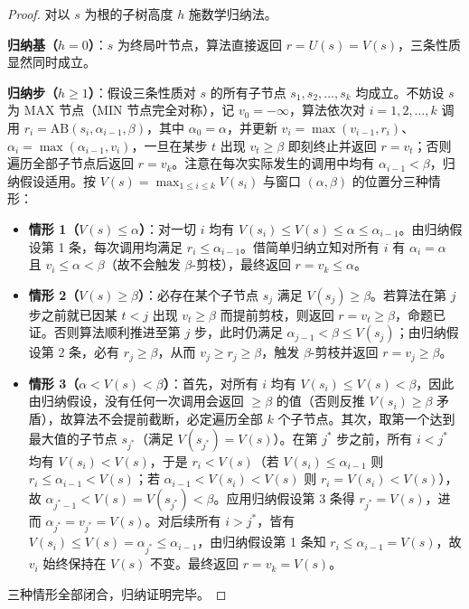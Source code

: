 \begin{proof}
对以 $s$ 为根的子树高度 $h$ 施数学归纳法。

\textbf{归纳基（$h=0$）}：$s$ 为终局叶节点，算法直接返回 $r = U(s) = V(s)$，三条性质显然同时成立。

\textbf{归纳步（$h \ge 1$）}：假设三条性质对 $s$ 的所有子节点 $s_1, s_2, \dots, s_k$ 均成立。不妨设 $s$ 为 \textsf{MAX} 节点（\textsf{MIN} 节点完全对称），记 $v_0 = -\infty$，算法依次对 $i = 1, 2, \dots, k$ 调用 $r_i = \mathrm{AB}(s_i, \alpha_{i-1}, \beta)$，其中 $\alpha_0 = \alpha$，并更新 $v_i = \max(v_{i-1}, r_i)$、$\alpha_i = \max(\alpha_{i-1}, v_i)$，一旦在某步 $t$ 出现 $v_t \ge \beta$ 即刻终止并返回 $r = v_t$；否则遍历全部子节点后返回 $r = v_k$。注意在每次实际发生的调用中均有 $\alpha_{i-1} < \beta$，归纳假设适用。按 $V(s) = \max_{1\le i\le k} V(s_i)$ 与窗口 $(\alpha, \beta)$ 的位置分三种情形：

\begin{itemize}
  \item \textbf{情形 1（$V(s) \le \alpha$）}：对一切 $i$ 均有 $V(s_i) \le V(s) \le \alpha \le \alpha_{i-1}$。由归纳假设第 1 条，每次调用均满足 $r_i \le \alpha_{i-1}$。借简单归纳立知对所有 $i$ 有 $\alpha_i = \alpha$ 且 $v_i \le \alpha < \beta$（故不会触发 $\beta$-剪枝），最终返回 $r = v_k \le \alpha$。
  \item \textbf{情形 2（$V(s) \ge \beta$）}：必存在某个子节点 $s_j$ 满足 $V(s_j) \ge \beta$。若算法在第 $j$ 步之前就已因某 $t < j$ 出现 $v_t \ge \beta$ 而提前剪枝，则返回 $r = v_t \ge \beta$，命题已证。否则算法顺利推进至第 $j$ 步，此时仍满足 $\alpha_{j-1} < \beta \le V(s_j)$；由归纳假设第 2 条，必有 $r_j \ge \beta$，从而 $v_j \ge r_j \ge \beta$，触发 $\beta$-剪枝并返回 $r = v_j \ge \beta$。
  \item \textbf{情形 3（$\alpha < V(s) < \beta$）}：首先，对所有 $i$ 均有 $V(s_i) \le V(s) < \beta$，因此由归纳假设，没有任何一次调用会返回 $\ge \beta$ 的值（否则反推 $V(s_i)\ge\beta$ 矛盾），故算法不会提前截断，必定遍历全部 $k$ 个子节点。其次，取第一个达到最大值的子节点 $s_{j^*}$（满足 $V(s_{j^*}) = V(s)$）。在第 $j^*$ 步之前，所有 $i < j^*$ 均有 $V(s_i) < V(s)$，于是 $r_i < V(s)$（若 $V(s_i)\le \alpha_{i-1}$ 则 $r_i\le \alpha_{i-1}<V(s)$；若 $\alpha_{i-1}<V(s_i)<V(s)$ 则 $r_i=V(s_i)<V(s)$），故 $\alpha_{j^*-1} < V(s) = V(s_{j^*}) < \beta$。应用归纳假设第 3 条得 $r_{j^*} = V(s)$，进而 $\alpha_{j^*} = v_{j^*} = V(s)$。对后续所有 $i > j^*$，皆有 $V(s_i) \le V(s) = \alpha_{j^*} \le \alpha_{i-1}$，由归纳假设第 1 条知 $r_i \le \alpha_{i-1} = V(s)$，故 $v_i$ 始终保持在 $V(s)$ 不变。最终返回 $r = v_k = V(s)$。
\end{itemize}
三种情形全部闭合，归纳证明完毕。
\end{proof}

